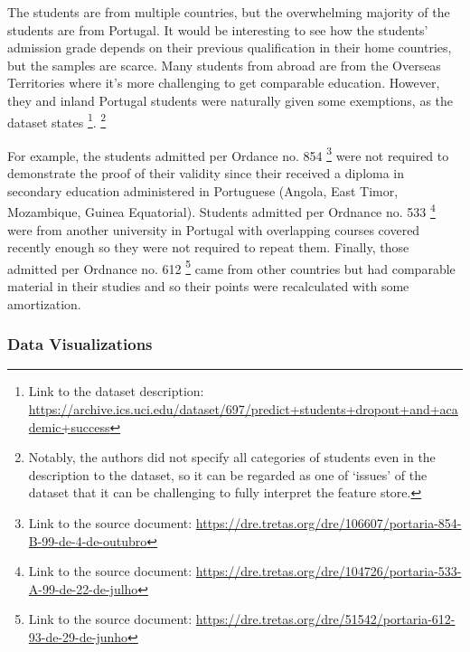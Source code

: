 \documentclass[
  letterpaper,
  DIV=11,
  numbers=noendperiod]{scrartcl}
\begin{document}
The students are from multiple countries, but the overwhelming majority
of the students are from Portugal. It would be interesting to see how
the students' admission grade depends on their previous qualification in
their home countries, but the samples are scarce. Many students from
abroad are from the Overseas Territories where it's more challenging to
get comparable education. However, they and inland Portugal students
were naturally given some exemptions, as the dataset states \footnote{Link
  to the dataset description:
  \url{https://archive.ics.uci.edu/dataset/697/predict+students+dropout+and+academic+success}}.
\footnote{Notably, the authors did not specify all categories of
  students even in the description to the dataset, so it can be regarded
  as one of \enquote*{issues} of the dataset that it can be challenging
  to fully interpret the feature store.}

For example, the students admitted per Ordance no. 854 \footnote{Link to
  the source document:
  \url{https://dre.tretas.org/dre/106607/portaria-854-B-99-de-4-de-outubro}}
were not required to demonstrate the proof of their validity since their
received a diploma in secondary education administered in Portuguese
(Angola, East Timor, Mozambique, Guinea Equatorial). Students admitted
per Ordnance no. 533 \footnote{Link to the source document:
  \url{https://dre.tretas.org/dre/104726/portaria-533-A-99-de-22-de-julho}}
were from another university in Portugal with overlapping courses
covered recently enough so they were not required to repeat them.
Finally, those admitted per Ordnance no. 612 \footnote{Link to the
  source document:
  \url{https://dre.tretas.org/dre/51542/portaria-612-93-de-29-de-junho}}
came from other countries but had comparable material in their studies
and so their points were recalculated with some amortization.

\hypertarget{data-visualizations}{%
\subsubsection{Data Visualizations}\label{data-visualizations}}
\end{document}
